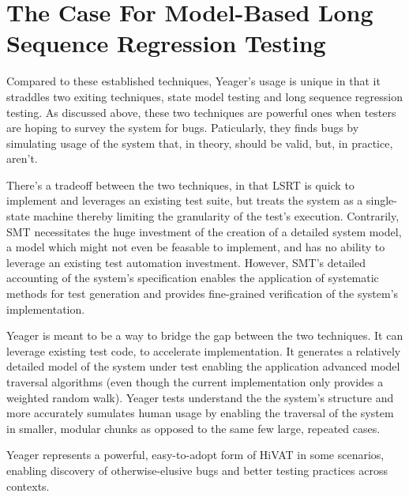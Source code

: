 \section{The Case For Model-Based Long Sequence Regression Testing}
Compared to these established techniques, Yeager's usage is unique in that it straddles two exiting techniques, state model testing and long sequence regression testing. As discussed above, these two techniques are powerful ones when testers are hoping to survey the system for bugs. Paticularly, they finds bugs by simulating usage of the system that, in theory, should be valid, but, in practice, aren't.

There's a tradeoff between the two techniques, in that LSRT is quick to implement and leverages an existing test suite, but treats the system as a single-state machine thereby limiting the granularity of the test's execution. Contrarily, SMT necessitates the huge investment of the creation of a detailed system model, a model which might not even be feasable to implement, and has no ability to leverage an existing test automation investment. However, SMT's detailed accounting of the system's specification enables the application of systematic methods for test generation and provides fine-grained verification of the system's implementation.

Yeager is meant to be a way to bridge the gap between the two techniques. It can leverage existing test code, to accelerate implementation. It generates a relatively detailed model of the system under test enabling the application advanced model traversal algorithms (even though the current implementation only provides a weighted random walk). Yeager tests understand the the system's structure and more accurately sumulates human usage by enabling the traversal of the system in smaller, modular chunks as opposed to the same few large, repeated cases.

Yeager represents a powerful, easy-to-adopt form of HiVAT in some scenarios, enabling discovery of otherwise-elusive bugs and better testing practices across contexts.
